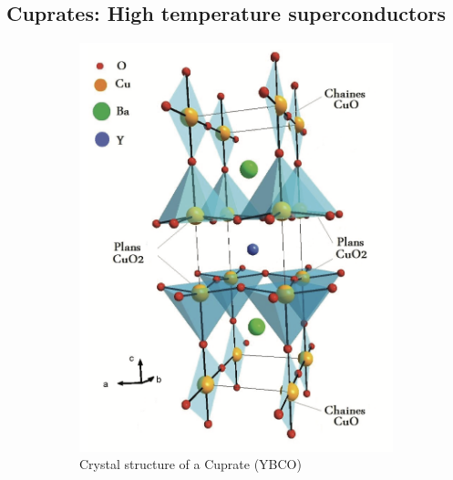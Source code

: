 \subsection{Cuprates: High temperature superconductors}
\begin{figure}
    \centering
    \begin{subfigure}{0.48\textwidth}
        \centering
        \includegraphics[width=\textwidth]{figures/cuprate_structure}
        \caption{Crystal structure of a Cuprate (YBCO)}
        \label{fig:cuprate_structure}
    \end{subfigure}
    \begin{subfigure}{0.48\textwidth}
        \centering

\end{subfigure}
\end{figure}
